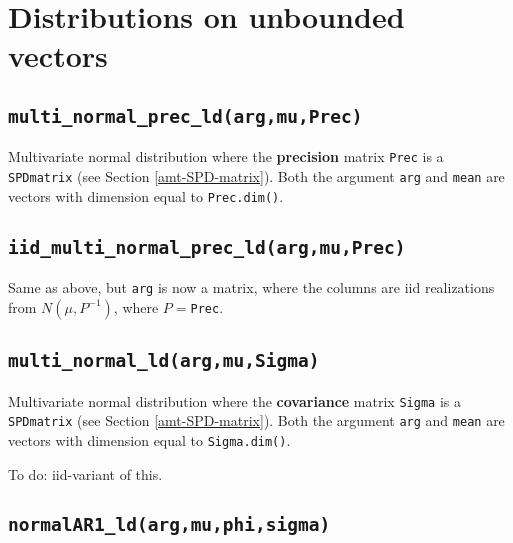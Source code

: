 \documentclass[
]{book}
\begin{document}
\hypertarget{distributions-on-unbounded-vectors}{%
\section{Distributions on unbounded vectors}\label{distributions-on-unbounded-vectors}}

\hypertarget{multi_normal_prec_ldargmuprec}{%
\subsection{\texorpdfstring{\texttt{multi\_normal\_prec\_ld(arg,mu,Prec)}}{multi\_normal\_prec\_ld(arg,mu,Prec)}}\label{multi_normal_prec_ldargmuprec}}

Multivariate normal distribution where the \textbf{precision} matrix \texttt{Prec} is a \texttt{SPDmatrix} (see Section \ref{amt-SPD-matrix}). Both the argument \texttt{arg} and \texttt{mean} are vectors with dimension equal to \texttt{Prec.dim()}.

\hypertarget{iid_multi_normal_prec_ldargmuprec}{%
\subsection{\texorpdfstring{\texttt{iid\_multi\_normal\_prec\_ld(arg,mu,Prec)}}{iid\_multi\_normal\_prec\_ld(arg,mu,Prec)}}\label{iid_multi_normal_prec_ldargmuprec}}

Same as above, but \texttt{arg} is now a matrix, where the columns are iid realizations from \(N(\mu,P^{-1})\), where \(P=\)\texttt{Prec}.

\hypertarget{multi_normal_ldargmusigma}{%
\subsection{\texorpdfstring{\texttt{multi\_normal\_ld(arg,mu,Sigma)}}{multi\_normal\_ld(arg,mu,Sigma)}}\label{multi_normal_ldargmusigma}}

Multivariate normal distribution where the \textbf{covariance} matrix \texttt{Sigma} is a \texttt{SPDmatrix} (see Section \ref{amt-SPD-matrix}). Both the argument \texttt{arg} and \texttt{mean} are vectors with dimension equal to \texttt{Sigma.dim()}.

To do: iid-variant of this.

\hypertarget{normalar1_ldargmuphisigma}{%
\subsection{\texorpdfstring{\texttt{normalAR1\_ld(arg,mu,phi,sigma)}}{normalAR1\_ld(arg,mu,phi,sigma)}}\label{normalar1_ldargmuphisigma}}
\end{document}
